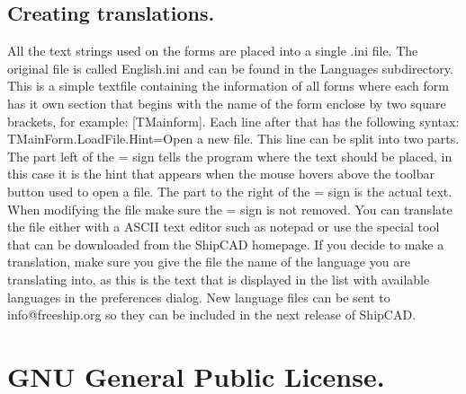 \documentclass[12pt]{article}
\begin{document}
\subsection{Creating translations.}
All the text strings used on the forms are placed into a single .ini file. The original file is called
English.ini and can be found in the Languages subdirectory. This is a simple textfile containing the
information of all forms where each form has it own section that begins with the name of the form
enclose by two square brackets, for example: [TMainform]. Each line after that has the following
syntax: TMainForm.LoadFile.Hint=Open a new file. This line can be split into two parts. The
part left of the = sign tells the program where the text should be placed, in this case it is the hint that
appears when the mouse hovers above the toolbar button used to open a file. The part to the right
of the = sign is the actual text. When modifying the file make sure the = sign is not removed. You
can translate the file either with a ASCII text editor such as notepad or use the special tool that can
be downloaded from the ShipCAD homepage. If you decide to make a translation, make sure you
give the file the name of the language you are translating into, as this is the text that is displayed in
the list with available languages in the preferences dialog. New language files can be sent to
info@freeship.org so they can be included in the next release of ShipCAD.
\pagebreak

\section{GNU General Public License.}
\end{document}
